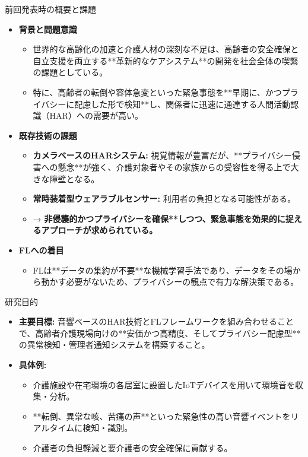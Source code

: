 \documentclass[unicode,12pt,aspectratio=169, dvipdfmx]{beamer}
\begin{document}
\begin{frame}{前回発表時の概要と課題}
\begin{itemize}
    \item \textbf{背景と問題意識}
    \begin{itemize}
        \item 世界的な高齢化の加速と介護人材の深刻な不足は、高齢者の安全確保と自立支援を両立する**革新的なケアシステム**の開発を社会全体の喫緊の課題としている。
        \item 特に、高齢者の転倒や容体急変といった緊急事態を**早期に、かつプライバシーに配慮した形で検知**し、関係者に迅速に通達する人間活動認識（HAR）への需要が高い。
    \end{itemize}
    \item \textbf{既存技術の課題}
    \begin{itemize}
        \item \textbf{カメラベースのHARシステム:} 視覚情報が豊富だが、**プライバシー侵害への懸念**が強く、介護対象者やその家族からの受容性を得る上で大きな障壁となる。
        \item \textbf{常時装着型ウェアラブルセンサー:} 利用者の負担となる可能性がある。
        \item → \textbf{非侵襲的かつプライバシーを確保**しつつ、緊急事態を効果的に捉えるアプローチが求められている。}
    \end{itemize}
    \item \textbf{FLへの着目}
    \begin{itemize}
        \item FLは**データの集約が不要**な機械学習手法であり、データをその場から動かす必要がないため、プライバシーの観点で有力な解決策である。
    \end{itemize}
\end{itemize}
\end{frame}

\begin{frame}{研究目的}
\begin{itemize}
    \item \textbf{主要目標:} 音響ベースのHAR技術とFLフレームワークを組み合わせることで、高齢者介護現場向けの**安価かつ高精度、そしてプライバシー配慮型**の異常検知・管理者通知システムを構築すること。
    \item \textbf{具体例:}
    \begin{itemize}
        \item 介護施設や在宅環境の各居室に設置したIoTデバイスを用いて環境音を収集・分析。
        \item **転倒、異常な咳、苦痛の声**といった緊急性の高い音響イベントをリアルタイムに検知・識別。
        \item 介護者の負担軽減と要介護者の安全確保に貢献する。
    \end{itemize}
\end{itemize}
\end{frame}
\end{document}
